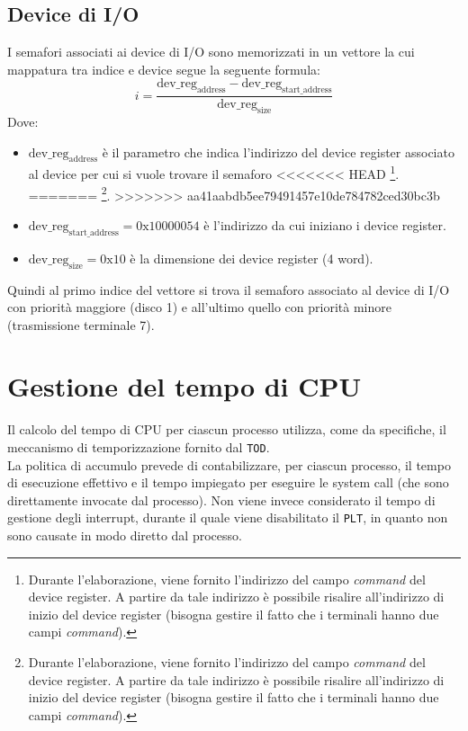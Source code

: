 \documentclass[11pt]{article}
\begin{document}
\subsection{Device di I/O}
I semafori associati ai device di I/O sono memorizzati in un vettore la cui mappatura tra indice e device segue la seguente formula:
\begin{equation}
    i = \dfrac{\text{dev\_reg}_{\text{address}} - \text{dev\_reg}_{\text{start\_address}}}{\text{dev\_reg}_{\text{size}}} 
\end{equation}
Dove:
\begin{itemize}
    \item $\text{dev\_reg}_{\text{address}}$ è il parametro che indica l'indirizzo del device register associato al device per cui si vuole trovare il semaforo
<<<<<<< HEAD
        \footnote{Durante l'elaborazione, viene fornito l'indirizzo del campo \textit{command} del device register. A partire da tale indirizzo è possibile risalire all'indirizzo di inizio del device register (bisogna gestire il fatto che i terminali hanno due campi \textit{command}).}.    
=======
            \footnote{Durante l'elaborazione, viene fornito l'indirizzo del campo \textit{command} del device register. A partire da tale indirizzo è possibile risalire all'indirizzo di inizio del device register (bisogna gestire il fatto che i terminali hanno due campi \textit{command}).}.
>>>>>>> aa41aabdb5ee79491457e10de784782ced30bc3b
    \item $\text{dev\_reg}_{\text{start\_address}}=0\text{x}10000054$ è l'indirizzo da cui iniziano i device register.
    \item $\text{dev\_reg}_{\text{size}}=0\text{x}10$ è la dimensione dei device register (4 word).
\end{itemize}
Quindi al primo indice del vettore si trova il semaforo associato al device di I/O con priorità maggiore (disco 1) e all'ultimo quello con priorità minore (trasmissione terminale 7).


\section{Gestione del tempo di CPU}
Il calcolo del tempo di CPU per ciascun processo utilizza, come da specifiche, il meccanismo di temporizzazione fornito dal \texttt{TOD}.\\
La politica di accumulo prevede di contabilizzare, per ciascun processo, il tempo di esecuzione effettivo e il tempo impiegato per eseguire le system call (che sono direttamente invocate dal processo).
Non viene invece considerato il tempo di gestione degli interrupt, durante il quale viene disabilitato il \texttt{PLT}, in quanto non sono causate in modo diretto dal processo.

\newpage
\end{document}
